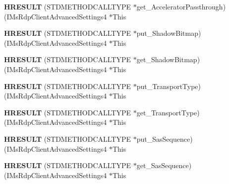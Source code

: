 \begin{DoxyCompactItemize}
{\bfseries H\+R\+E\+S\+U\+LT} (S\+T\+D\+M\+E\+T\+H\+O\+D\+C\+A\+L\+L\+T\+Y\+PE $\ast$get\+\_\+\+Accelerator\+Passthrough)(I\+Ms\+Rdp\+Client\+Advanced\+Settings4 $\ast$This
\item 
\mbox{\label{struct_i_ms_rdp_client_advanced_settings4_vtbl_acfcfc3f9aa145511bf1fc66b7defdab3}} 
{\bfseries H\+R\+E\+S\+U\+LT} (S\+T\+D\+M\+E\+T\+H\+O\+D\+C\+A\+L\+L\+T\+Y\+PE $\ast$put\+\_\+\+Shadow\+Bitmap)(I\+Ms\+Rdp\+Client\+Advanced\+Settings4 $\ast$This
\item 
\mbox{\label{struct_i_ms_rdp_client_advanced_settings4_vtbl_a9c9869ae8e7bb0a9561b8753fcdb3960}} 
{\bfseries H\+R\+E\+S\+U\+LT} (S\+T\+D\+M\+E\+T\+H\+O\+D\+C\+A\+L\+L\+T\+Y\+PE $\ast$get\+\_\+\+Shadow\+Bitmap)(I\+Ms\+Rdp\+Client\+Advanced\+Settings4 $\ast$This
\item 
\mbox{\label{struct_i_ms_rdp_client_advanced_settings4_vtbl_ae4a02c7adadce2e058f9eb5fe74516f7}} 
{\bfseries H\+R\+E\+S\+U\+LT} (S\+T\+D\+M\+E\+T\+H\+O\+D\+C\+A\+L\+L\+T\+Y\+PE $\ast$put\+\_\+\+Transport\+Type)(I\+Ms\+Rdp\+Client\+Advanced\+Settings4 $\ast$This
\item 
\mbox{\label{struct_i_ms_rdp_client_advanced_settings4_vtbl_abbc07836eb7865f15da6be1e1f5a0d85}} 
{\bfseries H\+R\+E\+S\+U\+LT} (S\+T\+D\+M\+E\+T\+H\+O\+D\+C\+A\+L\+L\+T\+Y\+PE $\ast$get\+\_\+\+Transport\+Type)(I\+Ms\+Rdp\+Client\+Advanced\+Settings4 $\ast$This
\item 
\mbox{\label{struct_i_ms_rdp_client_advanced_settings4_vtbl_ad44a9a14d1a5599b07be2dd2f1a2f226}} 
{\bfseries H\+R\+E\+S\+U\+LT} (S\+T\+D\+M\+E\+T\+H\+O\+D\+C\+A\+L\+L\+T\+Y\+PE $\ast$put\+\_\+\+Sas\+Sequence)(I\+Ms\+Rdp\+Client\+Advanced\+Settings4 $\ast$This
\item 
\mbox{\label{struct_i_ms_rdp_client_advanced_settings4_vtbl_a9cb26fcbb9c113b0e450c67982925f0d}} 
{\bfseries H\+R\+E\+S\+U\+LT} (S\+T\+D\+M\+E\+T\+H\+O\+D\+C\+A\+L\+L\+T\+Y\+PE $\ast$get\+\_\+\+Sas\+Sequence)(I\+Ms\+Rdp\+Client\+Advanced\+Settings4 $\ast$This
\item 

\end{DoxyCompactItemize}
